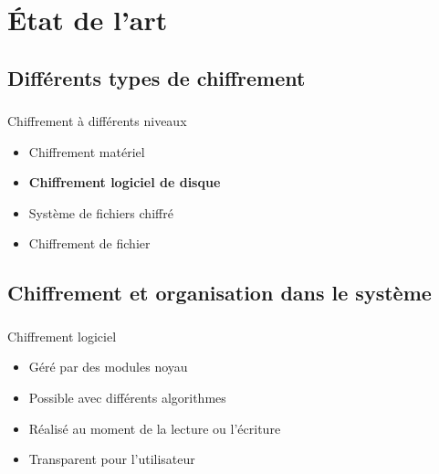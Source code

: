 \section{État de l'art}

\subsection{Différents types de chiffrement}

\begin{frame}
  \frametitle{\insertsubsectionhead{}}
  \begin{block}{Chiffrement à différents niveaux}
    \begin{itemize}
    \item Chiffrement matériel
    \item \textbf{Chiffrement logiciel de disque}
    \item Système de fichiers chiffré
    \item Chiffrement de fichier
    \end{itemize}
  \end{block}
\end{frame}

\subsection{Chiffrement et organisation dans le système}

\begin{frame}
  \frametitle{\insertsubsectionhead{}}
  \begin{block}{Chiffrement logiciel}
    \begin{itemize}
    \item Géré par des modules noyau
    \item Possible avec différents algorithmes
    \item Réalisé au moment de la lecture ou l'écriture
    \item Transparent pour l'utilisateur
    \end{itemize}
  \end{block}
\end{frame}

